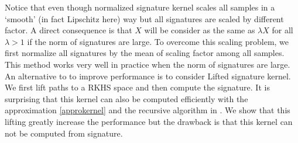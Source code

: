 \documentclass[12pt]{report}
\theoremstyle{definition}
\theoremstyle{remark}
\begin{document}
Notice that even though normalized signature kernel scales all samples in a `smooth' (in fact Lipschitz here) way but all signatures are scaled by different factor. A direct consequence is that $X$ will be consider as the same as $\lambda X$ for all $\lambda > 1$ if the norm of signatures are large. To overcome this scaling problem, we first normalize all signatures by the mean of scaling factor among all samples. This method works very well in practice when the norm of signatures are large. An alternative to to improve performance is to consider Lifted signature kernel. We first lift paths to a RKHS space and then compute the signature. It is surprising that this kernel can also be computed efficiently with the approximation \eqref{approkernel} and the recursive algorithm in \cite{chevyrev2018signature}. We show that this lifting greatly increase the performance but the drawback is that this kernel can not be computed from signature. 
\end{document}
